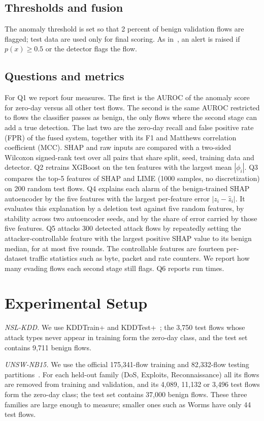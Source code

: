 \documentclass[conference]{IEEEtran}
\begin{document}
\subsection{Thresholds and fusion}
The anomaly threshold is set so that 2 percent of benign validation flows are flagged; test data are used only for final scoring. As in~\cite{barnard2022robust}, an alert is raised if $p(x)\geq 0.5$ or the detector flags the flow.

\subsection{Questions and metrics}
For Q1 we report four measures. The first is the AUROC of the anomaly score for zero-day versus all other test flows. The second is the same AUROC restricted to flows the classifier passes as benign, the only flows where the second stage can add a true detection. The last two are the zero-day recall and false positive rate (FPR) of the fused system, together with its F1 and Matthews correlation coefficient (MCC). SHAP and raw inputs are compared with a two-sided Wilcoxon signed-rank test over all pairs that share split, seed, training data and detector.
Q2 retrains XGBoost on the ten features with the largest mean $|\phi_i|$. Q3 compares the top-5 features of SHAP and LIME (1000 samples, no discretization) on 200 random test flows.
Q4 explains each alarm of the benign-trained SHAP autoencoder by the five features with the largest per-feature error $|z_i-\hat{z}_i|$. It evaluates this explanation by a deletion test against five random features, by stability across two autoencoder seeds, and by the share of error carried by those five features.
Q5 attacks 300 detected attack flows by repeatedly setting the attacker-controllable feature with the largest positive SHAP value to its benign median, for at most five rounds. The controllable features are fourteen per-dataset traffic statistics such as byte, packet and rate counters. We report how many evading flows each second stage still flags. Q6 reports run times.

\section{Experimental Setup}
\textit{NSL-KDD.} We use KDDTrain+ and KDDTest+~\cite{tavallaee2009nslkdd}; the 3,750 test flows whose attack types never appear in training form the zero-day class, and the test set contains 9,711 benign flows.

\textit{UNSW-NB15.} We use the official 175,341-flow training and 82,332-flow testing partitions~\cite{moustafa2015unsw}. For each held-out family (DoS, Exploits, Reconnaissance) all its flows are removed from training and validation, and its 4,089, 11,132 or 3,496 test flows form the zero-day class; the test set contains 37,000 benign flows. These three families are large enough to measure; smaller ones such as Worms have only 44 test flows.
\end{document}
